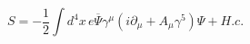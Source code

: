 \begin{equation}
S = - \frac{1}{2}\int d^4x \, e{\overline \Psi}\gamma^\mu
(i\partial_\mu + {A}_\mu\gamma^5 )\Psi + H. c. \label{flataction}
\end{equation}

